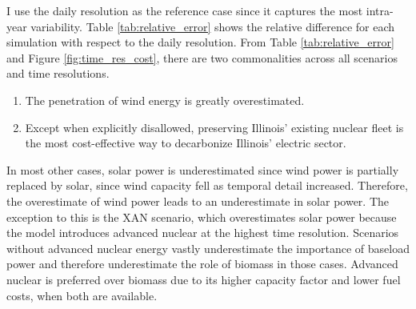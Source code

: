 I use the daily resolution as the reference case since it captures the most
intra-year variability.
Table \ref{tab:relative_error} shows the relative difference for each simulation
with respect to the daily resolution. From Table \ref{tab:relative_error} and
Figure \ref{fig:time_res_cost}, there are two commonalities across all scenarios
and time resolutions.
\begin{enumerate}
  \item The penetration of wind energy is greatly overestimated.
  \item Except when explicitly disallowed, preserving Illinois' existing nuclear
  fleet is the most cost-effective way to decarbonize Illinois' electric sector.
\end{enumerate}
In most other cases, solar power is underestimated since wind power is partially
replaced by solar, since wind capacity fell as temporal detail increased. Therefore,
the overestimate of wind power leads to an underestimate in
solar power. The exception to this is the \gls{XAN} scenario, which overestimates
solar power because the model introduces advanced nuclear at the highest time resolution.
Scenarios without advanced nuclear energy vastly underestimate the importance of
baseload power and therefore underestimate the role of biomass in those cases.
Advanced nuclear is preferred over biomass due to its higher capacity factor and
lower fuel costs, when both are available.

